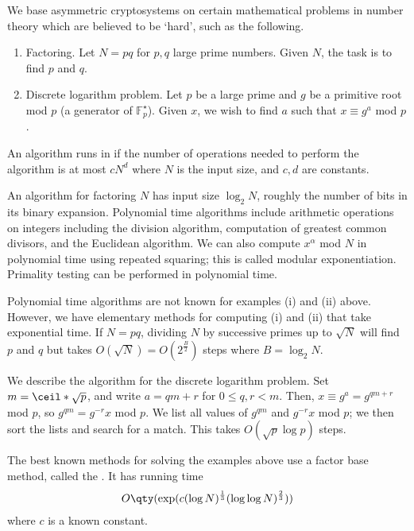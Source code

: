 We base asymmetric cryptosystems on certain mathematical problems in number theory which are believed to be `hard', such as the following.
\begin{enumerate}
    \item Factoring.
    Let $N = pq$ for $p, q$ large prime numbers.
    Given $N$, the task is to find $p$ and $q$.
    \item Discrete logarithm problem.
    Let $p$ be a large prime and $g$ be a primitive root mod $p$ (a generator of $\mathbb F_p^\star$).
    Given $x$, we wish to find $a$ such that $x \equiv g^a$ mod $p$.
\end{enumerate}
\begin{definition}
    An algorithm runs in  if the number of operations needed to perform the algorithm is at most $c N^d$ where $N$ is the input size, and $c, d$ are constants.
\end{definition}
\begin{example}
    An algorithm for factoring $N$ has input size $\log_2 N$, roughly the number of bits in its binary expansion.
    Polynomial time algorithms include arithmetic operations on integers including the division algorithm, computation of greatest common divisors, and the Euclidean algorithm.
    We can also compute $x^\alpha$ mod $N$ in polynomial time using repeated squaring; this is called modular exponentiation.
    Primality testing can be performed in polynomial time.

    Polynomial time algorithms are not known for examples (i) and (ii) above.
    However, we have elementary methods for computing (i) and (ii) that take exponential time.
    If $N = pq$, dividing $N$ by successive primes up to $\sqrt{N}$ will find $p$ and $q$ but takes $O(\sqrt{N}) = O(2^{\frac{B}{2}})$ steps where $B = \log_2 N$.

    We describe the  algorithm for the discrete logarithm problem.
    Set $m = \ceil*{\sqrt{p}}$, and write $a = qm + r$ for $0 \leq q, r < m$.
    Then, $x \equiv g^a = g^{qm + r}$ mod $p$, so $g^{qm} = g^{-r} x$ mod $p$.
    We list all values of $g^{qm}$ and $g^{-r}x$ mod $p$; we then sort the lists and search for a match.
    This takes $O(\sqrt{p}\log p)$ steps.

    The best known methods for solving the examples above use a factor base method, called the .
    It has running time
    \begin{align*}
        O\qty(\exp(c (\log N)^{\frac{1}{3}} (\log \log N)^{\frac{2}{3}}))
    \end{align*}
    where $c$ is a known constant.
\end{example}

